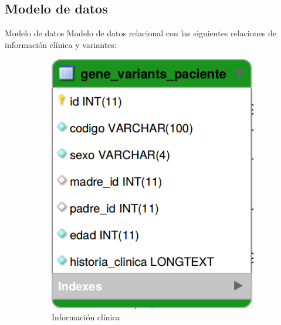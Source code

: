 \documentclass[xcolor=dvipsnames]{beamer}
\begin{document}
\subsection{Modelo de datos}
\begin{frame}{Modelo de datos}
Modelo de datos relacional con las siguientes relaciones de información clínica y variantes:
      \begin{figure}
		\centering
		\begin{subfigure}[b]{0.2\textwidth}
			\includegraphics[width=\textwidth]{tabla1.png}
			\caption{Información clínica}
		\end{subfigure}
		\quad
		~ %
		\begin{subfigure}[b]{0.2\textwidth}

\end{subfigure}
\end{figure}
\end{frame}
\end{document}
